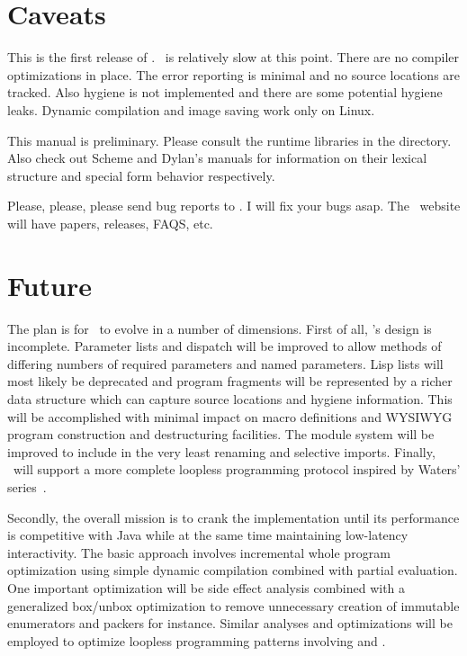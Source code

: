 \documentclass[twoside,twocolumn,9pt]{extarticle}
\begin{document}
\section{Caveats} 

This is the first release of \goo.
\goo\ is relatively slow at this point.  There are no compiler
optimizations in place.  The error reporting is minimal and no source
locations are tracked.  Also hygiene is not implemented and there are
some potential hygiene leaks.  Dynamic compilation and image saving
work only on Linux.

This manual is preliminary.  Please consult the runtime
libraries in the  directory.  Also check out Scheme and Dylan's
manuals for information on their lexical structure and special form
behavior respectively.

Please, please, please send bug reports to .  I
will fix your bugs asap.  The \goo\ website 
will have papers, releases, FAQS, etc.

\section{Future}

The plan is for \goo\ to evolve in a number of dimensions.  First of
all, \goo's design is incomplete.  Parameter lists and dispatch will
be improved to allow methods of differing numbers of required
parameters and named parameters.  Lisp lists will most likely be
deprecated and program fragments will be represented by a richer data
structure which can capture source locations and hygiene information.
This will be accomplished with minimal impact on macro definitions and
WYSIWYG program construction and destructuring facilities.  The module
system will be improved to include in the very least renaming and selective
imports. Finally, \goo\ will support a more complete loopless
programming protocol inspired by Waters'
series~\cite{Waters:1991:ATS}.

Secondly, the overall mission is to crank the implementation until its
performance is competitive with Java while at the same time
maintaining low-latency interactivity.  The basic approach involves
incremental whole program optimization using simple dynamic
compilation combined with partial evaluation.  One important
optimization will be side effect analysis combined with a generalized
box/unbox optimization to remove unnecessary creation of immutable
enumerators and packers for instance.  Similar analyses and
optimizations will be employed to optimize loopless programming
patterns involving  and .
\end{document}
